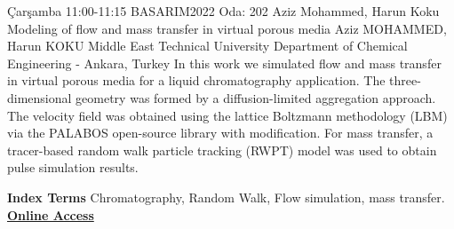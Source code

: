 
    \begin{abstract_basarim}
    {Çarşamba 11:00-11:15}
    {BASARIM2022}
    {Oda: 202}
    {Aziz Mohammed, Harun Koku}
    {Modeling of flow and mass transfer in virtual porous media}
    {%
    Aziz MOHAMMED, Harun KOKU}
    {%
    }
    {%
    Middle East Technical University Department of Chemical Engineering - Ankara, Turkey}
    In this work we simulated flow and mass transfer in virtual porous media for a liquid chromatography application. The three-dimensional geometry was formed by a diffusion-limited aggregation approach. The velocity field was obtained using the lattice Boltzmann methodology (LBM) via the PALABOS open-source library with modification. For mass transfer, a tracer-based random walk particle tracking (RWPT) model was used to obtain pulse simulation results. 
    
            \textbf{Index Terms} \newline{}Chromatography, Random Walk, Flow simulation, mass transfer.
     \newline\newline\noindent \href{https://drive.google.com/file/d/1FB0bPDXs4onqUyOKgBo9Y1AHFu_YKMrf/view?usp=drivesdk}{\bfseries Online Access}
    \end{abstract_basarim}
    